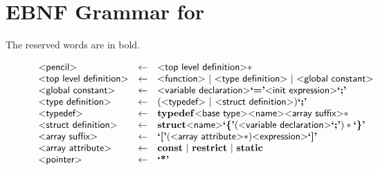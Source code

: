 \newpage

\section{EBNF Grammar for \pencil}
\label{pencil-ebnf}

The reserved words are in bold.

\newcommand{\pgrammar}[1]{\text{\sf\textless#1\textgreater}}
\newcommand{\pkeyword}[1]{\mathbf{#1}}
\newcommand{\plexer}[1]{\text{\bf`#1'}}

\begin{figure}[h!]
\[
\begin{array}{lcl}
  \pgrammar{pencil} & \gets &  \pgrammar{top level definition}*\\
  \pgrammar{top level definition} & \gets & \pgrammar{function}
                                          ~|~\pgrammar{type definition}
                                          ~|~\pgrammar{global constant}\\

  \pgrammar{global constant} & \gets & \pgrammar{variable declaration}
                                       \plexer{=}
                                       \pgrammar{init expression} \plexer{;}\\

  \pgrammar{type definition} & \gets & (\pgrammar{typedef}
                                     ~|~ \pgrammar{struct definition}) \plexer{;}\\

  \pgrammar{typedef} & \gets & \pkeyword{typedef} \pgrammar{base type} \pgrammar{name} \pgrammar{array suffix}*\\

  \pgrammar{struct definition} & \gets & \pkeyword{struct} \pgrammar{name}
                                         \plexer{\{}
                                           (\pgrammar{variable declaration} \plexer{;})*
                                         \plexer{\}}\\

  \pgrammar{array suffix} & \gets & \plexer{[}
                                     (\pgrammar{array attribute}*) \pgrammar{expression}
                                    \plexer{]}\\

  \pgrammar{array attribute} & \gets & \pkeyword{const} ~|~ \pkeyword{restrict} ~|~ \pkeyword{static}\\

  \pgrammar{pointer} & \gets &  \plexer{*}\\


\end{array}\]
\end{figure}
